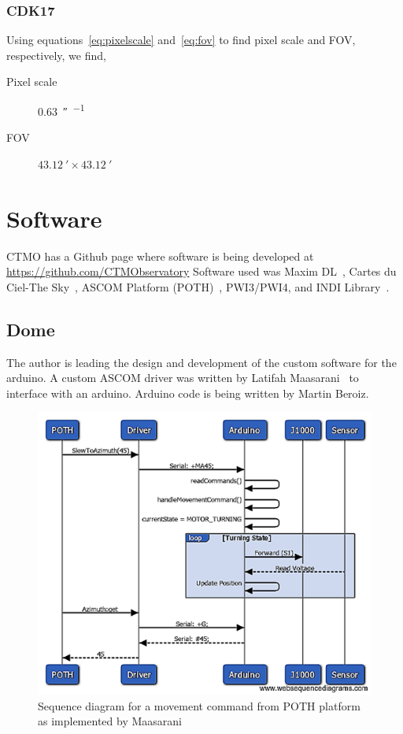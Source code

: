 \subsubsection{CDK17}
Using equations~\ref{eq:pixelscale} and~\ref{eq:fov} to find pixel scale and FOV, respectively, we find, 
\begin{description}
    \item[Pixel scale] \SI{0.63}{\arcsecond\per{}}
    \item[FOV] $\SI{43.12}{\arcminute} \times \SI{43.12}{\arcminute}$
\end{description}

\section{Software}
CTMO has a Github page where software is being developed at \url{https://github.com/CTMObservatory}
Software used was Maxim DL~\cite{maxim}, Cartes du Ciel-The Sky~\cite{cdc}, ASCOM Platform (POTH)~\cite{ascom},
PWI3/PWI4\cite{planewave}, and INDI Library~\cite{indi}.

\subsection{Dome}
The author is leading the design and development of the custom software for the arduino.
A custom ASCOM driver was written by Latifah Maasarani~\cite{maasarani_2017} to interface 
with an arduino. 
Arduino code is being written by Martin Beroiz.

\begin{figure}[h]
    \centering
    \includegraphics[width=\columnwidth]{figures/driver.png}
    \caption{Sequence diagram for a movement command from POTH platform as implemented by Maasarani~\protect\cite{maasarani_2017}}
\label{fig:driver}
\end{figure}

